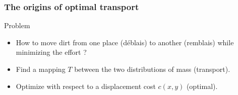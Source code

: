 \documentclass[french,9pt]{beamer}
\begin{document}
\begin{frame}
\frametitle{The origins of optimal transport}

\begin{center}
\end{center}

\begin{block}{Problem}
\begin{itemize}
\item How to move dirt from one place (déblais) to another (remblais) while minimizing the effort ?
\item Find a mapping $T$ between the two distributions of mass (transport).
\item Optimize with respect to a displacement cost $c(x,y)$ (optimal).
\end{itemize}
\end{block}


\end{frame}

\end{document}
